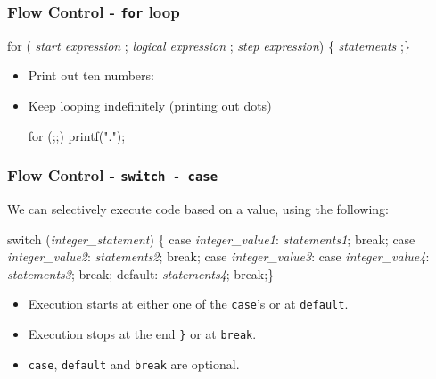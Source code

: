 \documentclass[table]{beamer}
\newif\ifschigh\schighfalse
\newcommand{\kw}[1]{\ifschigh\textcolor{red}{#1}\else\textcolor{keyword}{#1}\fi}
\newcommand{\kt}[1]{\ifschigh\textcolor{red}{#1}\else\textcolor{ctext}{#1}\fi}
\begin{document}
\begin{frame}[fragile]
\frametitle{Flow Control - {\tt for} loop}
\begin{block}{}
\begin{semiverbatim}
   \kw{for} ( \emph{start expression} ;
         \emph{logical expression} ;
         \emph{step expression})
         \{ \emph{statements} ;\}
\end{semiverbatim}
\end{block}
\begin{itemize}
\item Print out ten numbers:
\item Keep looping indefinitely (printing out dots)
\begin{semiverbatim}
   \kw{for} (;;) printf(\kt{"."});
\end{semiverbatim}
\end{itemize}
\end{frame}

\begin{frame}[fragile]
\frametitle{Flow Control - \tt switch - case}
We can selectively execute code based on a value, using the following:
\begin{block}{}
\begin{semiverbatim}
   \kw{switch} (\emph{integer\_statement}) \{
   \kw{case} \emph{integer\_value1}: \emph{statements1}; \kw{break};
   \kw{case} \emph{integer\_value2}: \emph{statements2}; \kw{break};
   \kw{case} \emph{integer\_value3}:
   \kw{case} \emph{integer\_value4}: \emph{statements3}; \kw{break};   
   \kw{default}: \emph{statements4}; \kw{break};\}
\end{semiverbatim}
\end{block}
\begin{itemize}
\item Execution starts at either one of the \kw{\tt case}'s or at \kw{\tt default}.
\item Execution stops at the end {\tt\}} or at \kw{\tt break}.
\item \kw{\tt case}, \kw{\tt default} and \kw{\tt break} are optional.
\end{itemize}
\end{frame}
\end{document}
